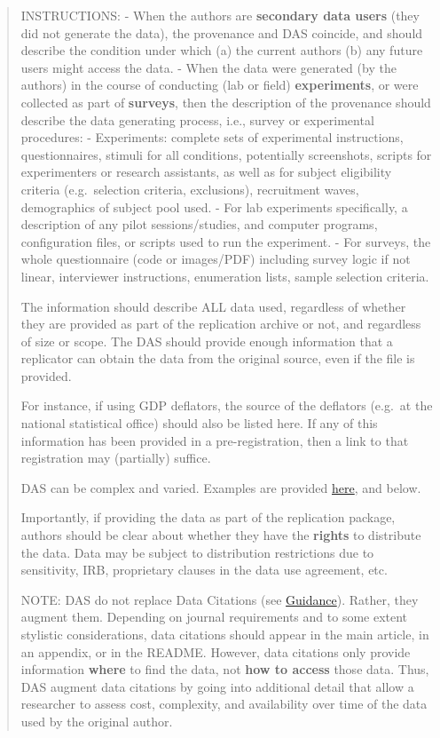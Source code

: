 \documentclass[
]{article}
\begin{document}
\begin{quote}
INSTRUCTIONS: - When the authors are \textbf{secondary data users} (they
did not generate the data), the provenance and DAS coincide, and should
describe the condition under which (a) the current authors (b) any
future users might access the data. - When the data were generated (by
the authors) in the course of conducting (lab or field)
\textbf{experiments}, or were collected as part of \textbf{surveys},
then the description of the provenance should describe the data
generating process, i.e., survey or experimental procedures: -
Experiments: complete sets of experimental instructions, questionnaires,
stimuli for all conditions, potentially screenshots, scripts for
experimenters or research assistants, as well as for subject eligibility
criteria (e.g.~selection criteria, exclusions), recruitment waves,
demographics of subject pool used. - For lab experiments specifically, a
description of any pilot sessions/studies, and computer programs,
configuration files, or scripts used to run the experiment. - For
surveys, the whole questionnaire (code or images/PDF) including survey
logic if not linear, interviewer instructions, enumeration lists, sample
selection criteria.

The information should describe ALL data used, regardless of whether
they are provided as part of the replication archive or not, and
regardless of size or scope. The DAS should provide enough information
that a replicator can obtain the data from the original source, even if
the file is provided.

For instance, if using GDP deflators, the source of the deflators
(e.g.~at the national statistical office) should also be listed here. If
any of this information has been provided in a pre-registration, then a
link to that registration may (partially) suffice.

DAS can be complex and varied. Examples are provided
\href{https://social-science-data-editors.github.io/guidance/Requested_information_dcas.html}{here},
and below.

Importantly, if providing the data as part of the replication package,
authors should be clear about whether they have the \textbf{rights} to
distribute the data. Data may be subject to distribution restrictions
due to sensitivity, IRB, proprietary clauses in the data use agreement,
etc.

NOTE: DAS do not replace Data Citations (see
\href{https://social-science-data-editors.github.io/guidance/Data_citation_guidance.html}{Guidance}).
Rather, they augment them. Depending on journal requirements and to some
extent stylistic considerations, data citations should appear in the
main article, in an appendix, or in the README. However, data citations
only provide information \textbf{where} to find the data, not
\textbf{how to access} those data. Thus, DAS augment data citations by
going into additional detail that allow a researcher to assess cost,
complexity, and availability over time of the data used by the original
author.
\end{quote}
\end{document}
